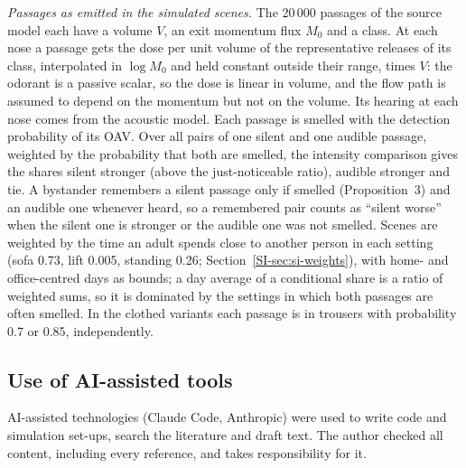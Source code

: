 \emph{Passages as emitted in the simulated scenes.} The 20\,000 passages of the source model each have a volume
$V$, an exit momentum flux $M_0$ and a class. At each nose a passage gets the dose per unit volume of the
representative releases of its class, interpolated in $\log M_0$ and held constant outside their range, times $V$:
the odorant is a passive scalar, so the dose is linear in volume, and the flow path is assumed to depend on the
momentum but not on the volume. Its hearing at each nose comes from the acoustic model. Each passage is smelled with the
detection probability of its OAV. Over all pairs of one silent and one audible passage, weighted by the probability
that both are smelled, the intensity comparison gives the shares silent stronger (above the just-noticeable ratio),
audible stronger and tie. A bystander remembers a silent passage only if smelled (Proposition~3) and an audible one
whenever heard, so a remembered pair counts as ``silent worse'' when the silent one is stronger or the audible one was
not smelled. Scenes are weighted by the time an adult spends close to another person in each setting (sofa 0.73, lift
0.005, standing 0.26; Section~\ref{SI-sec:si-weights}), with home- and office-centred days as bounds; a day average of
a conditional share is a ratio of weighted sums, so it is dominated by the settings in which both passages are often
smelled. In the clothed variants each passage is in trousers with probability 0.7 or 0.85, independently.

\subsection{Use of AI-assisted tools}
\label{sec:ai}
AI-assisted technologies (Claude Code, Anthropic) were used to write code and simulation set-ups, search the
literature and draft text. The author checked all content, including every reference, and takes responsibility
for it.

